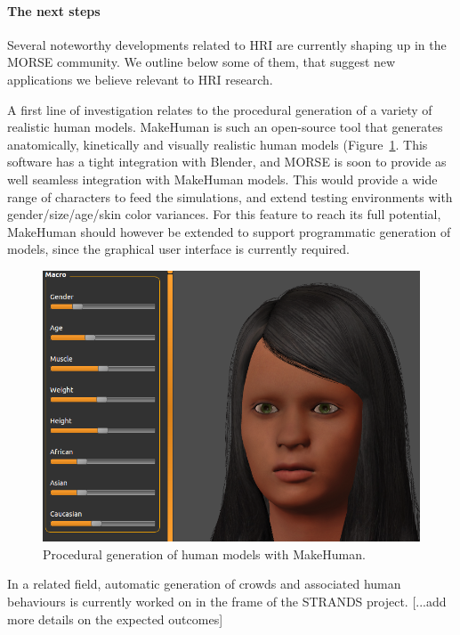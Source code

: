 \documentclass[conference]{IEEEtran}
\begin{document}
\paragraph*{The next steps}

Several noteworthy developments related to HRI are currently shaping up in the
MORSE community. We outline below some of them, that suggest new applications we
believe relevant to HRI research.

A first line of investigation relates to the procedural generation of a variety
of realistic human models. {\sc MakeHuman} is such an open-source tool that
generates anatomically, kinetically and visually realistic human models
(Figure~\ref{fig:makehuman}. This software has a tight integration with Blender,
and MORSE is soon to provide as well seamless integration with {\sc MakeHuman}
models. This would provide a wide range of characters to feed the simulations,
and extend testing environments with gender/size/age/skin color variances.  For
this feature to reach its full potential, {\sc MakeHuman} should however be
extended to support programmatic generation of models, since the graphical user
interface is currently required.

\begin{figure}[tb]
  \centering
  \includegraphics[width=.9\columnwidth]{figs/makehuman.png}
  \caption{Procedural generation of human models with {\sc MakeHuman}.}
  \label{fig:makehuman}
\end{figure}

In a related field, automatic generation of crowds and associated human
behaviours is currently worked on in the frame of the STRANDS project.
[...add more details on the expected outcomes]
\end{document}
